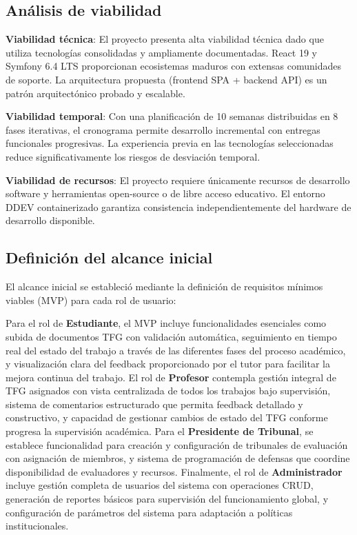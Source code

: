 \documentclass[12pt,a4paper,oneside]{report}
\begin{document}
\subsection{Análisis de viabilidad}\label{anuxe1lisis-de-viabilidad}

\textbf{Viabilidad técnica}: El proyecto presenta alta viabilidad
técnica dado que utiliza tecnologías consolidadas y ampliamente
documentadas. React 19 y Symfony 6.4 LTS proporcionan ecosistemas
maduros con extensas comunidades de soporte. La arquitectura propuesta
(frontend SPA + backend API) es un patrón arquitectónico probado y
escalable.

\textbf{Viabilidad temporal}: Con una planificación de 10 semanas
distribuidas en 8 fases iterativas, el cronograma permite desarrollo
incremental con entregas funcionales progresivas. La experiencia previa
en las tecnologías seleccionadas reduce significativamente los riesgos
de desviación temporal.

\textbf{Viabilidad de recursos}: El proyecto requiere únicamente
recursos de desarrollo software y herramientas open-source o de libre
acceso educativo. El entorno DDEV containerizado garantiza consistencia
independientemente del hardware de desarrollo disponible.

\subsection{Definición del alcance
inicial}\label{definiciuxf3n-del-alcance-inicial}

El alcance inicial se estableció mediante la definición de requisitos
mínimos viables (MVP) para cada rol de usuario:

Para el rol de \textbf{Estudiante}, el MVP incluye funcionalidades esenciales como subida de documentos TFG con validación automática, seguimiento en tiempo real del estado del trabajo a través de las diferentes fases del proceso académico, y visualización clara del feedback proporcionado por el tutor para facilitar la mejora continua del trabajo. El rol de \textbf{Profesor} contempla gestión integral de TFG asignados con vista centralizada de todos los trabajos bajo supervisión, sistema de comentarios estructurado que permita feedback detallado y constructivo, y capacidad de gestionar cambios de estado del TFG conforme progresa la supervisión académica. Para el \textbf{Presidente de Tribunal}, se establece funcionalidad para creación y configuración de tribunales de evaluación con asignación de miembros, y sistema de programación de defensas que coordine disponibilidad de evaluadores y recursos. Finalmente, el rol de \textbf{Administrador} incluye gestión completa de usuarios del sistema con operaciones CRUD, generación de reportes básicos para supervisión del funcionamiento global, y configuración de parámetros del sistema para adaptación a políticas institucionales.
\end{document}
